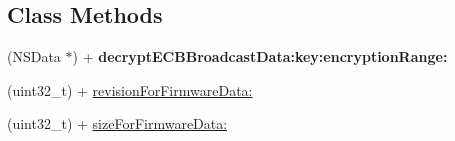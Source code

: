 \subsection*{Class Methods}
\begin{DoxyCompactItemize}
\item 
\hypertarget{interface_le_snf_device_aa66b5a9396a599684b91299069fa3797}{}(N\+S\+Data $\ast$) + {\bfseries decrypt\+E\+C\+B\+Broadcast\+Data\+:key\+:encryption\+Range\+:}\label{interface_le_snf_device_aa66b5a9396a599684b91299069fa3797}

\item 
(uint32\+\_\+t) + \hyperlink{interface_le_snf_device_a913ced45cb36f4b6252d213996cdaee7}{revision\+For\+Firmware\+Data\+:}
\item 
(uint32\+\_\+t) + \hyperlink{interface_le_snf_device_a9be881cab4d4489c75e59649c32b751b}{size\+For\+Firmware\+Data\+:}
\end{DoxyCompactItemize}

